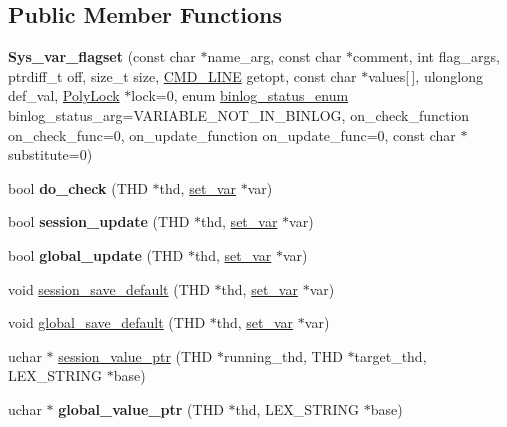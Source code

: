 \subsection*{Public Member Functions}
\begin{DoxyCompactItemize}
\item 
\mbox{\label{classSys__var__flagset_ad39b766037b93d8491ef952219d8f651}} 
{\bfseries Sys\+\_\+var\+\_\+flagset} (const char $\ast$name\+\_\+arg, const char $\ast$comment, int flag\+\_\+args, ptrdiff\+\_\+t off, size\+\_\+t size, \mbox{\hyperlink{structCMD__LINE}{C\+M\+D\+\_\+\+L\+I\+NE}} getopt, const char $\ast$values\mbox{[}$\,$\mbox{]}, ulonglong def\+\_\+val, \mbox{\hyperlink{classPolyLock}{Poly\+Lock}} $\ast$lock=0, enum \mbox{\hyperlink{classsys__var_a664520ec82191888717c86085bfa83ce}{binlog\+\_\+status\+\_\+enum}} binlog\+\_\+status\+\_\+arg=V\+A\+R\+I\+A\+B\+L\+E\+\_\+\+N\+O\+T\+\_\+\+I\+N\+\_\+\+B\+I\+N\+L\+OG, on\+\_\+check\+\_\+function on\+\_\+check\+\_\+func=0, on\+\_\+update\+\_\+function on\+\_\+update\+\_\+func=0, const char $\ast$substitute=0)
\item 
\mbox{\label{classSys__var__flagset_a46801245079fd9575ecfc4d8a7cfe248}} 
bool {\bfseries do\+\_\+check} (T\+HD $\ast$thd, \mbox{\hyperlink{classset__var}{set\+\_\+var}} $\ast$var)
\item 
\mbox{\label{classSys__var__flagset_a2a9c2e7c02d6e3b079b2865bb527ce5d}} 
bool {\bfseries session\+\_\+update} (T\+HD $\ast$thd, \mbox{\hyperlink{classset__var}{set\+\_\+var}} $\ast$var)
\item 
\mbox{\label{classSys__var__flagset_ae0d101237b8c05b5816aeea2dabe7c0e}} 
bool {\bfseries global\+\_\+update} (T\+HD $\ast$thd, \mbox{\hyperlink{classset__var}{set\+\_\+var}} $\ast$var)
\item 
void \mbox{\hyperlink{classSys__var__flagset_aeaad3a960202b38720fe10cbc76cf6d6}{session\+\_\+save\+\_\+default}} (T\+HD $\ast$thd, \mbox{\hyperlink{classset__var}{set\+\_\+var}} $\ast$var)
\item 
void \mbox{\hyperlink{classSys__var__flagset_a4c691624d5e68bde8e46b18fa45eee42}{global\+\_\+save\+\_\+default}} (T\+HD $\ast$thd, \mbox{\hyperlink{classset__var}{set\+\_\+var}} $\ast$var)
\item 
uchar $\ast$ \mbox{\hyperlink{classSys__var__flagset_aa48182db7ffa24ededa4cbd3fdbe8229}{session\+\_\+value\+\_\+ptr}} (T\+HD $\ast$running\+\_\+thd, T\+HD $\ast$target\+\_\+thd, L\+E\+X\+\_\+\+S\+T\+R\+I\+NG $\ast$base)
\item 
\mbox{\label{classSys__var__flagset_a53f06f6377b4b74daec39ee55b9647a6}} 
uchar $\ast$ {\bfseries global\+\_\+value\+\_\+ptr} (T\+HD $\ast$thd, L\+E\+X\+\_\+\+S\+T\+R\+I\+NG $\ast$base)
\end{DoxyCompactItemize}
